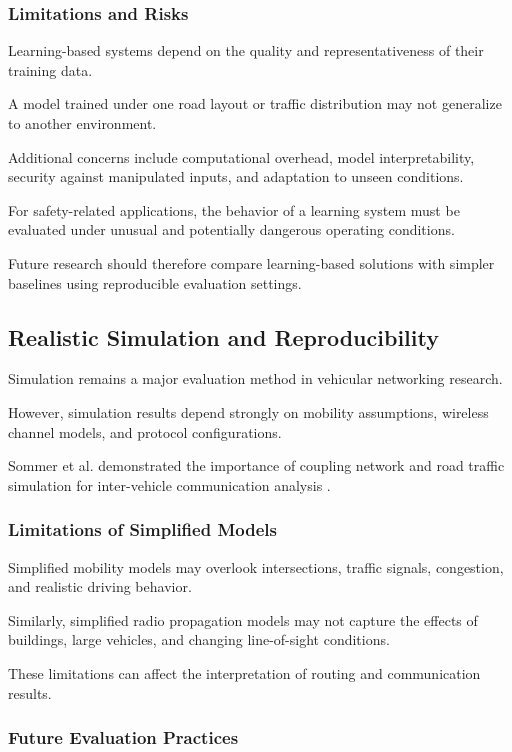 \subsubsection{Limitations and Risks}

Learning-based systems
depend on the quality
and representativeness
of their training data.

A model trained under
one road layout or
traffic distribution
may not generalize
to another environment.

Additional concerns
include computational
overhead, model
interpretability,
security against
manipulated inputs,
and adaptation to
unseen conditions.

For safety-related
applications, the
behavior of a learning
system must be evaluated
under unusual and
potentially dangerous
operating conditions.

Future research should
therefore compare
learning-based solutions
with simpler baselines
using reproducible
evaluation settings.

\subsection{Realistic Simulation and Reproducibility}

Simulation remains a
major evaluation method
in vehicular networking
research.

However, simulation
results depend strongly
on mobility assumptions,
wireless channel models,
and protocol configurations.

Sommer et al. demonstrated
the importance of
coupling network and
road traffic simulation
for inter-vehicle
communication analysis
\cite{Sommer2011}.

\subsubsection{Limitations of Simplified Models}

Simplified mobility
models may overlook
intersections, traffic
signals, congestion,
and realistic
driving behavior.

Similarly, simplified
radio propagation
models may not capture
the effects of buildings,
large vehicles, and
changing line-of-sight
conditions.

These limitations
can affect the
interpretation of
routing and
communication results.

\subsubsection{Future Evaluation Practices}

